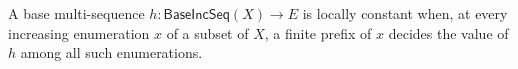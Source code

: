 \begin{definition}
A base multi-sequence $h:\mathsf{BaseIncSeq}(X)\to E$ is locally constant
when, at every increasing enumeration $x$ of a subset of $X$, a finite
prefix of $x$ decides the value of $h$ among all such enumerations.
\end{definition}
